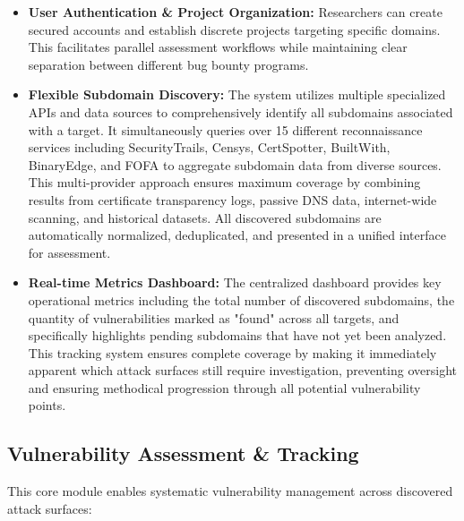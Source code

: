 \documentclass[conference]{IEEEtran}
\begin{document}
\begin{itemize}
    \item \textbf{User Authentication \& Project Organization:} Researchers can create secured accounts and establish discrete projects targeting specific domains. This facilitates parallel assessment workflows while maintaining clear separation between different bug bounty programs.
    
    \item \textbf{Flexible Subdomain Discovery:} The system utilizes multiple specialized APIs and data sources to comprehensively identify all subdomains associated with a target. It simultaneously queries over 15 different reconnaissance services including SecurityTrails, Censys, CertSpotter, BuiltWith, BinaryEdge, and FOFA to aggregate subdomain data from diverse sources. This multi-provider approach ensures maximum coverage by combining results from certificate transparency logs, passive DNS data, internet-wide scanning, and historical datasets. All discovered subdomains are automatically normalized, deduplicated, and presented in a unified interface for assessment.
    
    \item \textbf{Real-time Metrics Dashboard:} The centralized dashboard provides key operational metrics including the total number of discovered subdomains, the quantity of vulnerabilities marked as "found" across all targets, and specifically highlights pending subdomains that have not yet been analyzed. This tracking system ensures complete coverage by making it immediately apparent which attack surfaces still require investigation, preventing oversight and ensuring methodical progression through all potential vulnerability points.
\end{itemize}

\subsection{Vulnerability Assessment \& Tracking}
This core module enables systematic vulnerability management across discovered attack surfaces:
\end{document}

